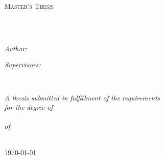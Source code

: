 \documentclass[
11pt, %
english, %
singlespacing, %
headsepline, %
]{MastersDoctoralThesis} %
\author{Ravshanbek \textsc{Khodzhimatov}} %
\begin{document}
\frontmatter %

\pagestyle{plain} %


\begin{titlepage}
\begin{center}

\vspace*{.06\textheight}
{\scshape\LARGE \univname\par}\vspace{1.5cm} %
\textsc{\Large Master's Thesis}\\[0.5cm] %

\HRule \\[0.4cm] %
{\huge \bfseries \ttitle\par}\vspace{0.4cm} %
\HRule \\[1.5cm] %
 
\begin{minipage}[t]{0.4\textwidth}
\begin{flushleft} \large
\emph{Author:}\\
\authorname %
\end{flushleft}
\end{minipage}
\begin{minipage}[t]{0.4\textwidth}
\begin{flushright} \large
\emph{Supervisors:} \\
\supname %
\end{flushright}
\end{minipage}\\[3cm]
 
\vfill

\large \textit{A thesis submitted in fulfillment of the requirements\\ for the degree of \\ \degreename} \\ \textit{of} \\ \deptname\\[2cm] %
 
\vfill

{\large \today}\\[4cm] %
 
\vfill
\end{center}
\end{titlepage}
\end{document}
